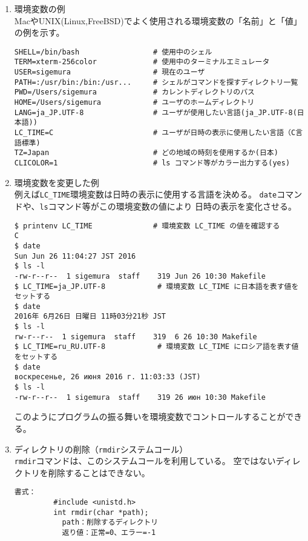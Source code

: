 \documentclass[a4j,dvipdfmx]{jarticle}
\begin{document}
\begin{enumerate}
\item 環境変数の例 \\
MacやUNIX(Linux,FreeBSD)でよく使用される環境変数の「名前」と「値」の例を示す。
\begin{lstlisting}[numbers=none]
SHELL=/bin/bash                 # 使用中のシェル
TERM=xterm-256color             # 使用中のターミナルエミュレータ
USER=sigemura                   # 現在のユーザ
PATH=:/usr/bin:/bin:/usr...     # シェルがコマンドを探すディレクトリ一覧
PWD=/Users/sigemura             # カレントディレクトリのパス
HOME=/Users/sigemura            # ユーザのホームディレクトリ
LANG=ja_JP.UTF-8                # ユーザが使用したい言語(ja_JP.UTF-8(日本語))
LC_TIME=C                       # ユーザが日時の表示に使用したい言語（C言語標準)
TZ=Japan                        # どの地域の時刻を使用するか(日本)
CLICOLOR=1                      # ls コマンド等がカラー出力する(yes)
\end{lstlisting}

\item 環境変数を変更した例 \\
例えば\verb/LC_TIME/環境変数は日時の表示に使用する言語を決める。
\verb/date/コマンドや、\verb/ls/コマンド等がこの環境変数の値により
日時の表示を変化させる。
\begin{lstlisting}[numbers=none]
$ printenv LC_TIME              # 環境変数 LC_TIME の値を確認する
C
$ date
Sun Jun 26 11:04:27 JST 2016
$ ls -l
-rw-r--r--  1 sigemura  staff    319 Jun 26 10:30 Makefile
$ LC_TIME=ja_JP.UTF-8            # 環境変数 LC_TIME に日本語を表す値をセットする
$ date
2016年 6月26日 日曜日 11時03分21秒 JST
$ ls -l
rw-r--r--  1 sigemura  staff    319  6 26 10:30 Makefile
$ LC_TIME=ru_RU.UTF-8            # 環境変数 LC_TIME にロシア語を表す値をセットする
$ date
воскресенье, 26 июня 2016 г. 11:03:33 (JST)
$ ls -l
-rw-r--r--  1 sigemura  staff    319 26 июн 10:30 Makefile
\end{lstlisting}
このようにプログラムの振る舞いを環境変数でコントロールすることができる。

\item ディレクトリの削除（{\tt rmdir}システムコール）\\
{\tt rmdir}コマンドは、このシステムコールを利用している。
空ではないディレクトリを削除することはできない。
\begin{lstlisting}[numbers=none]
書式：
         #include <unistd.h>
         int rmdir(char *path);
           path：削除するディレクトリ
           返り値：正常=0、エラー=-1


\end{lstlisting}
\end{enumerate}
\end{document}
